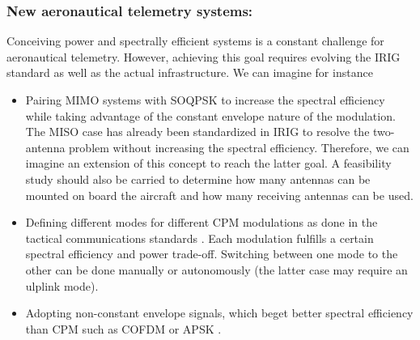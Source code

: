 \subsubsection*{New aeronautical telemetry systems:}
Conceiving power and spectrally efficient systems is a constant challenge for aeronautical telemetry. However, achieving this goal requires evolving the IRIG standard as well as the actual infrastructure. We can imagine for instance 
\begin{itemize}
\item Pairing MIMO systems with SOQPSK to increase the spectral efficiency while taking advantage of the constant envelope nature of the modulation. The MISO case has already been standardized in IRIG to resolve the two-antenna problem without increasing the spectral efficiency. Therefore, we can imagine an extension of this concept to reach the latter goal. A feasibility study should also be carried to determine how many antennas can be mounted on board the aircraft and how many receiving antennas can be used. 
\item  Defining different modes for different CPM modulations as done in the tactical communications standards \cite{nato2}. Each modulation fulfills a certain spectral efficiency and power trade-off. Switching between one mode to the other can be done manually or autonomously (the latter case may require an ulplink mode).  
\item Adopting non-constant envelope signals, which beget better spectral efficiency than CPM such as COFDM \cite{channel_cband_zds} or APSK \cite{apsk}. 
\end{itemize}